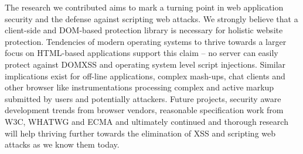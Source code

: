 The research we contributed aims to mark a turning point in web application security and the defense against scripting web attacks. We strongly believe that a client-side and DOM-based protection library is necessary for holistic website protection. Tendencies of modern operating systems to thrive towards a larger focus on HTML-based applications support this claim -- no server can easily protect against DOMXSS and operating system level script injections. Similar implications exist for off-line applications, complex mash-ups, chat clients and other browser like instrumentations processing complex and active markup submitted by users and potentially attackers. Future projects, security aware development trends from browser vendors, reasonable specification work from W3C, WHATWG and ECMA and ultimately continued and thorough research will help thriving further towards the elimination of XSS and scripting web attacks as we know them today.

